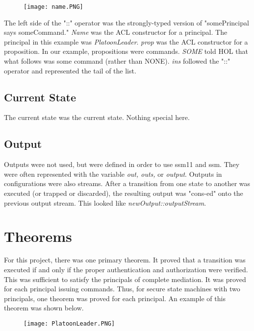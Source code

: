     \begin{figure}[h]
  \centering
  \texttt{[image: name.PNG]}
\end{figure}

 The left side of the "::" operator was the strongly-typed version of "somePrincipal says
  someCommand."  \textit{Name} was the ACL constructor for a principal.  The principal in this
  example was \textit{PlatoonLeader}. \textit{prop} was the ACL constructor for a proposition.
  In our example, propositions were commands.  \textit{SOME} told HOL that what follows was some
  command (rather than NONE).   \textit{ins} followed the "::" operator and represented the tail
  of the list.

\subsection{Current State}
\label{sec:current-state}

The current state was the current state.  Nothing special here.

\subsection{Output}
\label{sec:output}

Outputs were not used, but were defined in order to use ssm11 and ssm.  They were often represented
with the variable \textit{out, outs,} or \textit{output}.  Outputs in configurations were also streams.
After a transition from one state to another was executed (or trapped or discarded), the resulting
output was "cons-ed" onto the previous output stream.  This looked like \textit{newOutput::outputStream}.

\section{Theorems}
\label{sec:theorems}

 For this project, there was one primary theorem.  It proved that a transition was executed if
  and only if the proper authentication and authorization were verified.  This was sufficient to
  satisfy the principals of complete mediation.  It was proved for each principal issuing commands.
  Thus, for secure state machines with two principals, one theorem was proved for each principal.
  An example of this theorem was shown below.\\
  
\begin{figure}[h]
  \centering
  \texttt{[image: PlatoonLeader.PNG]}
\end{figure}

